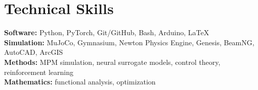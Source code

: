 \documentclass[11pt,letterpaper]{article}
\begin{document}
\section{Technical Skills}
\textbf{Software:} Python, PyTorch, Git/GitHub, Bash, Arduino, \LaTeX \\[3pt]
\textbf{Simulation:} MuJoCo, Gymnasium, Newton Physics Engine, Genesis, BeamNG, AutoCAD, ArcGIS \\[3pt]
\textbf{Methods:} MPM simulation, neural surrogate models, control theory, reinforcement learning \\[3pt]
\textbf{Mathematics:} functional analysis, optimization

\end{document}

